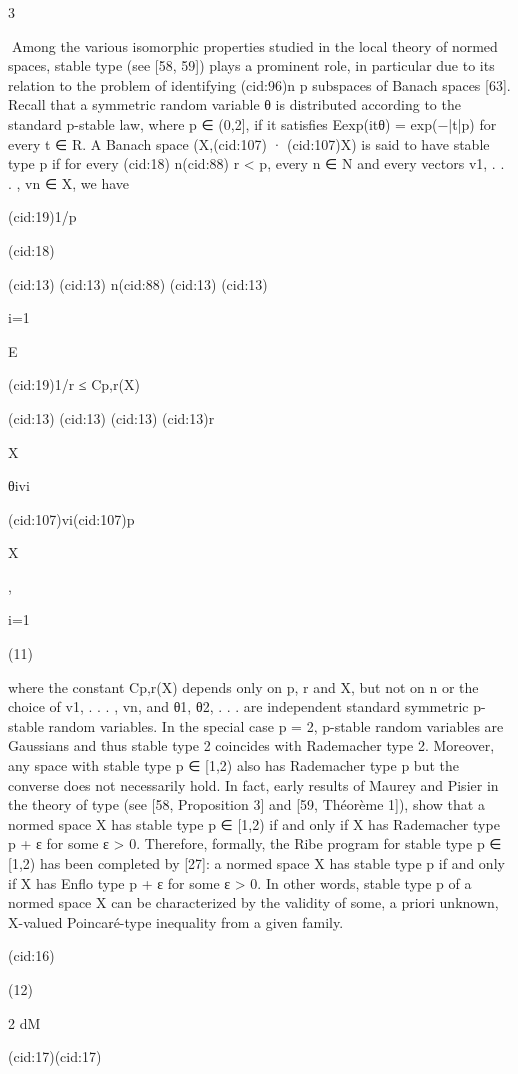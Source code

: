 3

Among the various isomorphic properties studied in the local theory of normed spaces,
stable type (see [58, 59]) plays a prominent role, in particular due to its relation to the problem
of identifying (cid:96)n
p subspaces of Banach spaces [63]. Recall that a symmetric random variable θ
is distributed according to the standard p-stable law, where p ∈ (0,2], if it satisﬁes Eexp(itθ) =
exp(−|t|p) for every t ∈ R. A Banach space (X,(cid:107) · (cid:107)X) is said to have stable type p if for every
(cid:18) n(cid:88)
r < p, every n ∈ N and every vectors v1, . . . , vn ∈ X, we have

(cid:19)1/p

(cid:18)

(cid:13)
(cid:13) n(cid:88)
(cid:13)
(cid:13)

i=1

E

(cid:19)1/r ≤ Cp,r(X)

(cid:13)
(cid:13)
(cid:13)
(cid:13)r

X

θivi

(cid:107)vi(cid:107)p

X

,

i=1

(11)

where the constant Cp,r(X) depends only on p, r and X, but not on n or the choice of v1, . . . , vn,
and θ1, θ2, . . . are independent standard symmetric p-stable random variables.
In the special case p = 2, p-stable random variables are Gaussians and thus stable type 2
coincides with Rademacher type 2. Moreover, any space with stable type p ∈ [1,2) also has
Rademacher type p but the converse does not necessarily hold. In fact, early results of Maurey
and Pisier in the theory of type (see [58, Proposition 3] and [59, Théorème 1]), show that a
normed space X has stable type p ∈ [1,2) if and only if X has Rademacher type p + ε for some
ε > 0. Therefore, formally, the Ribe program for stable type p ∈ [1,2) has been completed by
[27]: a normed space X has stable type p if and only if X has Enﬂo type p + ε for some ε > 0. In
other words, stable type p of a normed space X can be characterized by the validity of some, a
priori unknown, X-valued Poincaré-type inequality from a given family.

(cid:16)

(12)

2 dM

(cid:17)(cid:17)

